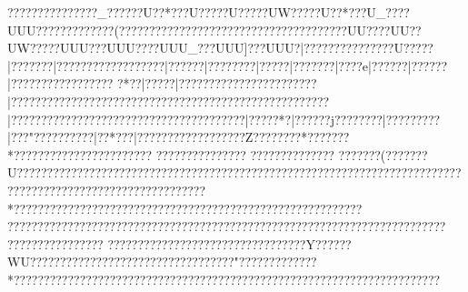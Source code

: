 {{{{{{{{{{{{{{{{{{{{{{{{{{{{{{{{{{{{{{{{{{{{{{{{{{{{{{{{{{{{{{{{{{{{{{{{{{{{{{{{{{{{{{{{{{{{{{{{{{{{{{{{{{{{{{{{{{{{{{{{{{{{{{{{{{{{{{{{{{{{{{{{{{{{{{{{{{{{{{{{{{{{{{{{{{{{{{{{{{{{{{{{{{{{{{{{{{{{{{{{{{{{{{{{{{{{{{{{{{{{{{{{{{{{{{{{{{{{{{{{{{{{{{{{{{{{{{{{{{{{{{{{{{{{{{{{{{{{{{{{{{{{{{{{{{{{{{{{{{{{{{{{{{{{{{{{{{{{{{{{{{{{{{{{{{{{{{{{{{{{{{{{{{{{{{{{{{{{{{{{{{{{{{{{{{{{{{{{{{{{{{{{{{{{{{{{{{{{{{{{{{{{{{{{{{{{{{{{{{{{{{{{{{{{{{{{{{{{{{{{{{{{{{{{{{{{{{{{{{{{{{{{{{{{{{{{{{{{{{{{{{{{{{{{{{{{{{{{{{{{{{{{{{{{{{{{{{{{{{{{{{{{{{{{{{{{{{{{{{{{{{{{{{{{{{{{{{{{{{{{{{{{{{{{{{{{{{{{{{{{{{{{{{{{{{{{{{{{{{{{{{{{{{{{{{{{{{{{{{{{{{{{{{{{{{{{{{{{{{{{{{{{{{{{{{{{{{{{{{{{{{{{{{{{{{{{{{{{{{{{{{{{{{{{{{{{{{{{{{{{{{{{{{{{{{{{{{{{{{{{{{{{{{{{{{{{{{{{{{{{{{{{{{{{{{{{{{{{{{{{{{{{{{{{{{{{{{{{{{{{{{{{{{{{{{{{{{{{{{{{{{{{{{{{{{{{{{{{{{{{{{{{{{{{{{{{{{{{{{{{{{{{{{{{{{{{{{{{{{{{{{{{{{{{{{{{{{{{{{{{{{{{{{{{{{{{{{{{{{{{{{{{{{{{{{{{{{{{{{{{{{{{{{{{{{{{{{{{{{{{{{{{{{{{{{{{{{{{{{{{{{{{{{{{{{{{{{{{{{{{{{{{{{{{{{{{{{{{{{{{{{{{{{{{{{{{{{{{{{{{{{{{{{{{{{{{{{{{{{{{{{{{{{{{{{{{{{{{{{{{{{{{{{{{{{{{{{{{{{{{{{{{{{{{{{{{{{{{{{{{{{{{{{{{{{{{{{{{{{{{{{{{{{{{{{{{{{{{{{{{{{{{{{{{{{{{{{{{{{{{{{{{{{{{{{{{{{{{{{{{{{{{{{{{{{{{{{{{{{{{{{{{{{{{{{{{{{{{{{{{{{{{{{{{{{{{{{{{{{{{{{{{{{{{{{{{{{{{{{{{{{{{{{{{{{{{{{{{{{{{{{{{{{{{{{{{{{{{{{{{{{{{{{{{{{{{{{{{{{{{{{{{{{{{{{{{{{{{{{{{{{{{{{{{{{{{{{{{{{{{{{{{{{{{{{{{{{{{{{{{{{{{{{{{{{{{{{{{{{{{{{{{{{{{{{{{{{{{{{{{{{{{{{{{{{{{{{{{{{{{{{{{{{{{{{{{{{{{{{{{{{{{{{{{{{{{{{{{{{{{{{{{{{{{{{{{{{{{{{{{{{{{{{{{{{{{{{{{{{{{{{{{{{{{{{{{{{{{{{{{{{{{{{{{{{{{{{{{{{{{{{{{{{{{{{{{{{{{{{{{{{{{{{{{{{{{{{{{{{{{{{{{{{{{{{{{{{{{{{{{{{{{{{{{{{{{{{{{{{{{{{{{{{{{{{{{{{{{{{{{{{{{{{{{{{{{{{{{{{{{{{{{{{{{{{{{{{{{{{{{{{{{{{{{{{{{{{{{{{{{{{{{{{{{{{{{{{{{{{{{{{{{{{{{{{{{{{{{{{{{{{{{{{{{{{{{{{{{{{{{{{{{{{{{{{{{{{{{{{{{{{{{{{{{{{{{{{{{{{{{{{{{{{{{{{{{{{{{{{{{{{{{{{{{{{{{{{{{{{{{{{{{{{{{{{{{{{{{{{{{{{{{{{{{???????????????_??????U??*???U?????U?????UW?????U??*???U_????UUU??  ?????  ???   ???(  ????  ???  ?????  ????? ?????? ?????? ????????{?UU???{?UU}}{?{?UW????{?UUU}??{?UUU???{?UUU_??{?UUU]??{?UUU?|?{???????{??????{?U?????|???????|?????{???????{??????|?{?????|?{???????|?????|?{?????{?|????e|?{?????|?{?????|?{?????{???????????  ?*??|?????|???????????????????????|?????????????????????????????????????????????????????|???????????????????????????????????????|?????*?|??????j????????|?????????|???" ??????????|??*? ??|???? ??????????????Z????????*???????*???????????????????????
??????????????? ??????????????
???????(???????U???????????????????????????????????????????????????????????????????????????????????????????????????????????*?????????????????????????????????????????????????????????? ?????????????????????????????????????????????????????????????????????????
???????????????? ?????????????????????????????????Y??????WU??????????????????????????????????"?????????????*??????????????????????????????????????????????????????????????????? ???? }}}}}}}}}}}}}}}}}}}}}}}}}}}}}}}}}}}}}}}}}}}}}}}}}}}}}}}}}}}}}}}}}}}}}}}}}}}}}}}}}}}}}}}}}}}}}}}}}}}}}}}}}}}}}}}}}}}}}}}}}}}}}}}}}}}}}}}}}}}}}}}}}}}}}}}}}}}}}}}}}}}}}}}}}}}}}}}}}}}}}}}}}}}}}}}}}}}}}}}}}}}}}}}}}}}}}}}}}}}}}}}}}}}}}}}}}}}}}}}}}}}}}}}}}}}}}}}}}}}}}}}}}}}}}}}}}}}}}}}}}}}}}}}}}}}}}}}}}}}}}}}}}}}}}}}}}}}}}}}}}}}}}}}}}}}}}}}}}}}}}}}}}}}}}}}}}}}}}}}}}}}}}}}}}}}}}}}}}}}}}}}}}}}}}}}}}}}}}}}}}}}}}}}}}}}}}}}}}}}}}}}}}}}}}}}}}}}}}}}}}}}}}}}}}}}}}}}}}}}}}}}}}}}}}}}}}}}}}}}}}}}}}}}}}}}}}}}}}}}}}}}}}}}}}}}}}}}}}}}}}}}}}}}}}}}}}}}}}}}}}}}}}}}}}}}}}}}}}}}}}}}}}}}}}}}}}}}}}}}}}}}}}}}}}}}}}}}}}}}}}}}}}}}}}}}}}}}}}}}}}}}}}}}}}}}}}}}}}}}}}}}}}}}}}}}}}}}}}}}}}}}}}}}}}}}}}}}}}}}}}}}}}}}}}}}}}}}}}}}}}}}}}}}}}}}}}}}}}}}}}}}}}}}}}}}}}}}}}}}}}}}}}}}}}}}}}}}}}}}}}}}}}}}}}}}}}}}}}}}}}}}}}}}}}}}}}}}}}}}}}}}}}}}}}}}}}}}}}}}}}}}}}}}}}}}}}}}}}}}}}}}}}}}}}}}}}}}}}}}}}}}}}}}}}}}}}}}}}}}}}}}}}}}}}}}}}}}}}}}}}}}}}}}}}}}}}}}}}}}}}}}}}}}}}}}}}}}}}}}}}}}}}}}}}}}}}}}}}}}}}}}}}}}}}}}}}}}}}}}}}}}}}}}}}}}}}}}}}}}}}}}}}}}}}}}}}}}}}}}}}}}}}}}}}}}}}}}}}}}}}}}}}}}}}}}}}}}}}}}}}}}}}}}}}}}}}}}}}}}}}}}}}}}}}}}}}}}}}}}}}}}}}}}}}}}}}}}}}}}}}}}}}}}}}}}}}}}}}}}}}}}}}}}}}}}}}}}}}}}}}}}}}}}}}}}}}}}}}}}}}}}}}}}}}}}}}}}}}}}}}}}}}}}}}}}}}}}}}}}}}}}}}}}}}}}}}}}}}}}}}}}}}}}}}}}}}}}}}}}}}}}}}}}}}}}}}}}}}}}}}}}}}}}}}}}}}}}}}}}}}}}}}}}}}}}}}}}}}}}}}}}}}}}}}}}}}}}}}}}}}}}}}}}}}}}}}}}}}}}}}}}}}}}}}}}}}}}}}}}}}}}}}}}}}}}}}}}}}}}}}}}}}}}}}}}}}}}}}}}}}}}}}}}}}}}}}}}}}}}}}}}}}}}}}}}}}}}}}}}}}}}}}}}}}}}}}}}}}}}}}}}}}}}}}}}}}}}}}}}}}}}}}}}}}}}}}}}}}}}}}}}}}}}}}}}}}}}}}}}}}}}}}}}}}}}}}}}}}}}}}}}}}}}}}}}}}}}}}}}}}}}}}}}}}}}}}}}}}}}}}}}}}}}}}}}}}}}}}}}}}}}}}}}}}}}}}}}}}}}}}}}}}}}}}}}}}}}}}}}}}}}}}}}}}}}}}}}}}}}}}}}}}}}}}}}}}}}}}}}}}}}}}}}}}}}}}}}}}}}}}}}}}}}}}}}}}}}}}}}}}}}}}}}}}}}}}}}}}}}}}}}}}}}}}}}}}}}}}}}}}}}}}}}}}}}}}}}}}}}}}}}}}}}}}}}}}}}}}}}}}}}}}}}}}}}}}}}}}}}}}}}}}}}}}}}}}}}}}}}}}}}}}}}}}}}}}}}}}}}}}}}}}}}}}}}}}}}}}}}}}}}}}}}

